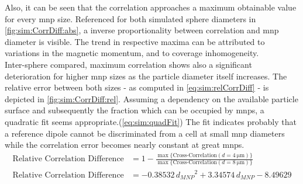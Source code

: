 Also, it can be seen that the correlation approaches a maximum obtainable value for every \gls{mnp} size. Referenced for both simulated sphere diameters in \cref{fig:sim:CorrDiff:abs}, a inverse proportionality between correlation and \gls{mnp} diameter is visible. The trend in respective maxima can be attributed to variations in the magnetic momentum, and to coverage inhomogeneity. \\ 
Inter-sphere compared, maximum correlation shows also a significant deterioration for higher \gls{mnp} sizes as the particle diameter itself increases. The relative error between both sizes - as computed in \cref{eq:sim:relCorrDiff} -  is depicted in \cref{fig:sim:CorrDiff:rel}. Assuming a dependency on the available particle surface and subsequently the fraction which can be occupied by \glspl{mnp}, a quadratic fit seems appropriate.(\cref{eq:sim:quadFit}) The fit indicates probably that a reference dipole cannot be discriminated from a cell at small \gls{mnp} diameters while the correlation error becomes nearly constant at great \glspl{mnp}.
\begin{align}
	\text{Relative\ Correlation\ Difference} &= 1- \frac{\max\{\text{Cross-Correlation}(d=\SI{4}{\micro\meter})\}}{\max\{\text{Cross-Correlation}(d = \SI{8}{\micro\meter})\}} \label{eq:sim:relCorrDiff}\\
	\text{Relative\ Correlation\ Difference} &= \num{-0,38532} \, {d_{MNP}}^2 + \num{3,34574} \, d_{MNP} - \num{8,49629} \label{eq:sim:quadFit}
\end{align}
